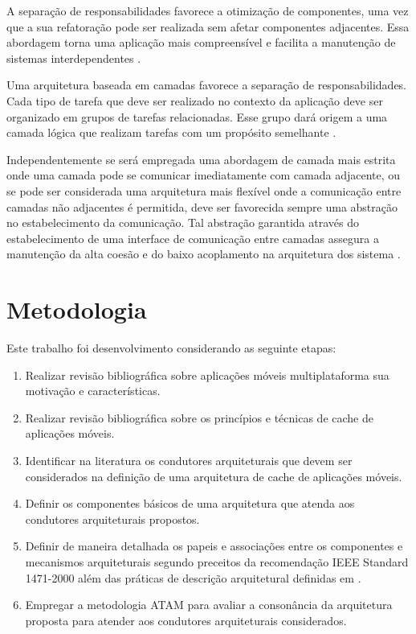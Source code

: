 \documentclass[
	article,			%
	11pt,				%
	oneside,			%
	a4paper,			%
	english,			%
	brazil,				%
	sumario=tradicional
]{abntex2}
\begin{document}
A separação de responsabilidades favorece a otimização de componentes, uma vez que a sua refatoração pode ser realizada sem afetar componentes adjacentes. Essa abordagem torna uma aplicação mais compreensível e facilita a manutenção de sistemas interdependentes \cite{meier2009microsoft}.

Uma arquitetura baseada em camadas favorece a separação de responsabilidades. Cada tipo de tarefa que deve ser realizado no contexto da aplicação deve ser organizado em grupos de tarefas relacionadas. Esse grupo dará origem a uma camada lógica que realizam tarefas com um propósito semelhante \cite{meier2009microsoft}. 

Independentemente se será empregada uma abordagem de camada mais estrita onde uma camada pode se comunicar imediatamente com camada adjacente, ou se pode ser considerada uma arquitetura mais flexível onde a comunicação entre camadas não adjacentes é permitida, deve ser favorecida sempre uma abstração no estabelecimento da comunicação. Tal abstração garantida através do estabelecimento de uma interface de comunicação entre camadas assegura a manutenção da alta coesão e do baixo acoplamento na arquitetura dos sistema \cite{meier2009microsoft}.

\chapter{Metodologia}
Este trabalho foi desenvolvimento considerando as seguinte etapas:

\begin{enumerate}
	
	\item Realizar revisão bibliográfica sobre aplicações móveis multiplataforma sua motivação e características.
	
	\item Realizar revisão bibliográfica sobre os princípios e técnicas de cache de aplicações móveis.
	
	\item Identificar na literatura os condutores arquiteturais que devem ser considerados na definição de uma arquitetura de cache de aplicações móveis.
	
	\item Definir os componentes básicos de uma arquitetura que atenda aos condutores arquiteturais propostos.
	
	\item Definir de maneira detalhada os papeis e associações entre os componentes e mecanismos arquiteturais segundo preceitos da recomendação IEEE Standard 1471-2000 além das práticas de descrição arquitetural definidas em \cite{bass2012practice}\cite{bachmann2010DocumentingSoftware}.
	
	\item Empregar a metodologia ATAM para avaliar a consonância da arquitetura proposta para atender aos condutores arquiteturais considerados.
\end{enumerate}
\end{document}
